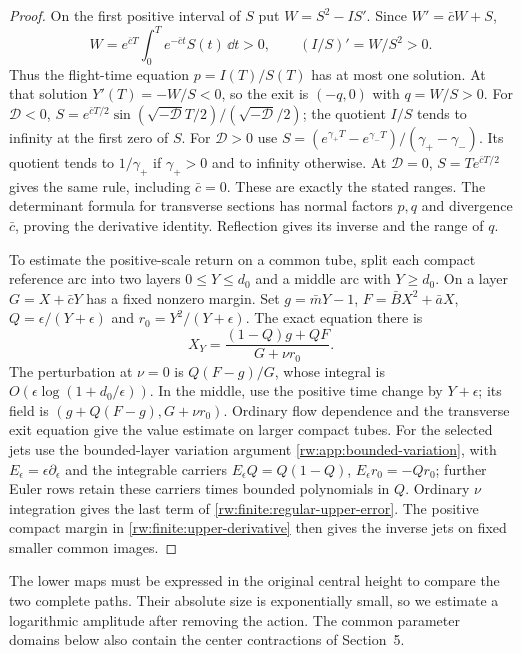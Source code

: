 \begin{proof}
On the first positive interval of $S$ put $W=S^2-IS'$.
Since $W'=\bar cW+S$,
\[
 W=e^{\bar cT}\int_0^T e^{-\bar ct}S(t)\,\dd t>0,
 \qquad (I/S)'=W/S^2>0.
\]
Thus the flight-time equation $p=I(T)/S(T)$ has at most one
solution. At that solution $Y'(T)=-W/S<0$, so the exit is
$(-q,0)$ with $q=W/S>0$.
For $\mathcal D<0$, $S=e^{\bar cT/2}\sin(\sqrt{-\mathcal D}T/2)
/(\sqrt{-\mathcal D}/2)$; the quotient $I/S$ tends to infinity
at the first zero of $S$. For $\mathcal D>0$ use
$S=(e^{\gamma_+T}-e^{\gamma_-T})/(\gamma_+-\gamma_-)$.
Its quotient tends to $1/\gamma_+$ if $\gamma_+>0$ and to infinity
otherwise. At $\mathcal D=0$, $S=Te^{\bar cT/2}$ gives the same
rule, including $\bar c=0$. These are exactly the stated ranges.
The determinant formula for transverse sections has normal factors
$p,q$ and divergence $\bar c$, proving the derivative identity.
Reflection gives its inverse and the range of $q$.

To estimate the positive-scale return on a common tube, split each
compact reference arc into two layers $0\le Y\le d_0$ and a middle
arc with $Y\ge d_0$.
On a layer $G=X+\bar cY$ has a fixed nonzero margin. Set
$g=\bar mY-1$, $F=\bar BX^2+\bar aX$,
$Q=\epsilon/(Y+\epsilon)$ and $r_0=Y^2/(Y+\epsilon)$.
The exact equation there is
\[
 X_Y=\frac{(1-Q)g+QF}{G+\nu r_0}.
\]
The perturbation at $\nu=0$ is $Q(F-g)/G$, whose integral is
$O(\epsilon\log(1+d_0/\epsilon))$. In the middle, use the
positive time change by $Y+\epsilon$; its field is
$(g+Q(F-g),G+\nu r_0)$. Ordinary flow dependence and the transverse
exit equation give the value estimate on larger compact tubes.
For the selected jets use the bounded-layer variation argument
\eqref{rw:app:bounded-variation}, with $E_\epsilon=\epsilon\partial_\epsilon$
and the integrable carriers $E_\epsilon Q=Q(1-Q)$,
$E_\epsilon r_0=-Qr_0$; further Euler
rows retain these carriers times bounded polynomials in $Q$.
Ordinary $\nu$ integration gives the last term of
\eqref{rw:finite:regular-upper-error}. The positive compact margin
in \eqref{rw:finite:upper-derivative} then gives the inverse jets on
fixed smaller common images.
\end{proof}

The lower maps must be expressed in the original central height to
compare the two complete paths. Their absolute size is exponentially
small, so we estimate a logarithmic amplitude after removing the action.
The common parameter domains below also contain the center contractions
of Section~5.

